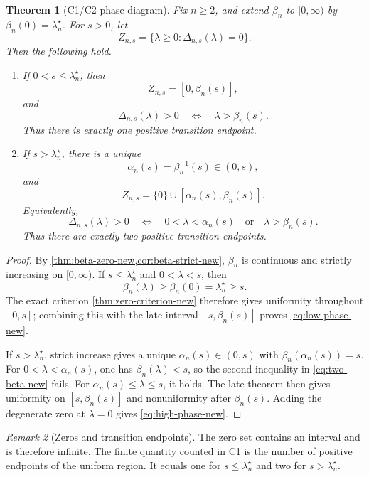 \documentclass[11pt]{article}
\theoremstyle{plain}
\newtheorem{theorem}{Theorem}[section]
\theoremstyle{definition}
\theoremstyle{remark}
\newtheorem{remark}[theorem]{Remark}
\begin{document}
\begin{theorem}[C1/C2 phase diagram]\label{thm:C1C2-new}
Fix \(n\ge2\), and extend \(\beta_n\) to \([0,\infty)\) by \(\beta_n(0)=\lambda_n^\star\).  For \(s>0\), let
\[
Z_{n,s}=\{\lambda\ge0:\Delta_{n,s}(\lambda)=0\}.
\]
Then the following hold.
\begin{enumerate}[label=\textup{(\alph*)}]
\item If \(0<s\le\lambda_n^\star\), then
\begin{equation}\label{eq:low-phase-new}
Z_{n,s}=[0,\beta_n(s)],
\end{equation}
and
\[
\Delta_{n,s}(\lambda)>0
\quad\Longleftrightarrow\quad
\lambda>\beta_n(s).
\]
Thus there is exactly one positive transition endpoint.
\item If \(s>\lambda_n^\star\), there is a unique
\[
\alpha_n(s)=\beta_n^{-1}(s)\in(0,s),
\]
and
\begin{equation}\label{eq:high-phase-new}
Z_{n,s}=\{0\}\cup[\alpha_n(s),\beta_n(s)].
\end{equation}
Equivalently,
\[
\Delta_{n,s}(\lambda)>0
\quad\Longleftrightarrow\quad
0<\lambda<\alpha_n(s)
\quad\text{or}\quad
\lambda>\beta_n(s).
\]
Thus there are exactly two positive transition endpoints.
\end{enumerate}
\end{theorem}

\begin{proof}
By \cref{thm:beta-zero-new,cor:beta-strict-new}, \(\beta_n\) is continuous and strictly increasing on \([0,\infty)\).  If \(s\le\lambda_n^\star\) and \(0<\lambda<s\), then
\[
\beta_n(\lambda)\ge\beta_n(0)=\lambda_n^\star\ge s.
\]
The exact criterion \cref{thm:zero-criterion-new} therefore gives uniformity throughout \([0,s]\); combining this with the late interval \([s,\beta_n(s)]\) proves \eqref{eq:low-phase-new}.

If \(s>\lambda_n^\star\), strict increase gives a unique \(\alpha_n(s)\in(0,s)\) with \(\beta_n(\alpha_n(s))=s\).  For \(0<\lambda<\alpha_n(s)\), one has \(\beta_n(\lambda)<s\), so the second inequality in \eqref{eq:two-beta-new} fails.  For \(\alpha_n(s)\le\lambda\le s\), it holds.  The late theorem then gives uniformity on \([s,\beta_n(s)]\) and nonuniformity after \(\beta_n(s)\).  Adding the degenerate zero at \(\lambda=0\) gives \eqref{eq:high-phase-new}.
\end{proof}

\begin{remark}[Zeros and transition endpoints]
The zero set contains an interval and is therefore infinite.  The finite quantity counted in C1 is the number of positive endpoints of the uniform region.  It equals one for \(s\le\lambda_n^\star\) and two for \(s>\lambda_n^\star\).
\end{remark}
\end{document}
